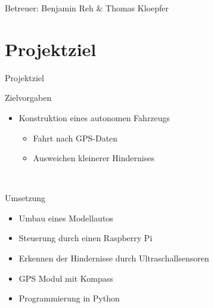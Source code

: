 \begin{frame}[label=title]{}
\titlepage
\begin{center} Betreuer: Benjamin Reh \& Thomas Kloepfer
\end{center}
\end{frame}
\begin{frame}[label=title]{}
\tableofcontents
\end{frame}

\section{Projektziel}
\begin{frame}{Projektziel}
\begin{exampleblock}{Zielvorgaben}
\begin{itemize}
\item Konstruktion eines autonomen Fahrzeugs
\begin{itemize}
\item Fahrt nach GPS-Daten
\item Ausweichen kleinerer Hindernises
\end{itemize}
\end{itemize}
\end{exampleblock}
\\[0.5cm]
\begin{exampleblock}{Umsetzung}
\begin{itemize}
\item Umbau eines Modellautos
\item Steuerung durch einen Raspberry Pi
\item Erkennen der Hindernisse durch Ultraschallsensoren
\item GPS Modul mit Kompass
\item Programmierung in Python
\end{itemize}
\end{exampleblock}
\end{frame}

